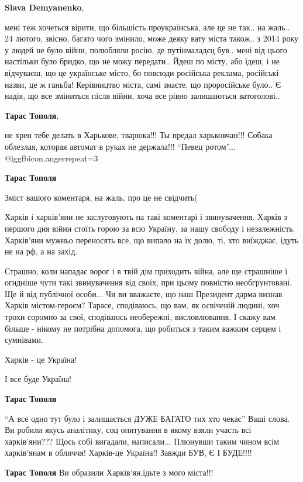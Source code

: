 \begin{itemize}
\begin{itemize}
\textbf{Slava Demyanenko}, 

мені теж хочеться вірити, що більшість проукраїнська, але це не так.. на жаль..
24 лютого, звісно, багато чого змінило, може деяку вату міста також.. з 2014
року у людей не було війни, полюбляли росію, де путінмаладєц був.. мені від
цього настільки було бридко, що не можу передати.. Йдеш по місту, або їдеш, і
не відчуваєш, що це українське місто, бо повсюди російська реклама, російські
назви, це ж ганьба! Керівництво міста, самі знаєте, що проросійське було.. Є
надія, що все зміниться після війни, хоча все рівно залишаються ватоголові..

\textbf{Тарас Тополя}, 

не хрен тебе делать в Харькове, тварюка!!! Ты предал харьковчан!!! Собака
облезлая, которая автомат в руках не держала!!! \enquote{Певец ротом}... @igg{fbicon.anger}{repeat=3} 

\textbf{Тарас Тополя} 

Зміст вашого коментаря, на жаль, про це не свідчить(

Харків і харків'яни не заслуговують на такі коментарі і звинувачення. Харків з
першого дня війни стоїть горою за всю Україну, за нашу свободу і незалежність.
Харків'яни мужньо переносять все, що випало на їх долю, ті, хто виїжджає, ідуть
не на рф, а на захід.

Страшно, коли нападає ворог і в твій дім приходить війна, але ще страшніше і
огидніше чути такі звинувачення від своїх, при цьому повністю необгрунтовані.
Ще й від публічної особи... Чи ви вважаєте, що наш Президент дарма визнав
Харків містом-героєм? Тарасе, сподіваюсь, що вам, як освіченій людині, хоч
трохи соромно за свої, сподіваюсь необережні, висловлювання. І скажу вам більше
- нікому не потрібна допомога, що робиться з таким важким серцем і сумнівами.

Харків - це Україна!

І все буде Україна!

\textbf{Тарас Тополя}

\enquote{А все одно тут було і залишається ДУЖЕ БАГАТО тих хто чекає} Ваші слова. Ви
робили якусь аналітику, соц опитування в якому взяли участь всі харків'яни???
Щось собі вигадали, написали... Плюнувши таким чином всім харків'янам в
обличчя! Харків-це Україна!! Завжди БУВ, Є І БУДЕ!!!!

\textbf{Тарас Тополя} Ви образили Харків‘ян,їдьте з мого міста!!!


\end{itemize}
\end{itemize}
